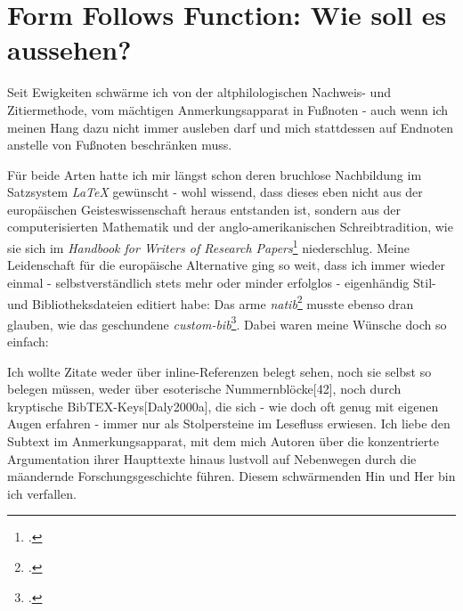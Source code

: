%
%
%
%
%
\section{Form Follows Function: Wie soll es aussehen?}

Seit Ewigkeiten schwärme ich von der altphilologischen Nachweis- und
Zitiermethode, vom mächtigen Anmerkungsapparat in Fußnoten - auch wenn ich
meinen Hang dazu nicht immer ausleben darf und mich stattdessen auf Endnoten
anstelle von Fußnoten beschränken muss.

Für beide Arten hatte ich mir längst schon deren bruchlose Nachbildung im
Satzsystem \emph{LaTeX} gewünscht - wohl wissend, dass dieses eben nicht aus der
europäischen Geisteswissenschaft heraus entstanden ist, sondern aus der
computerisierten Mathematik und der anglo-amerikanischen Schreibtradition, wie
sie sich im \textit{Handbook for Writers of Research
Papers}\footcite[vgl.][]{ModLanAss2009a} niederschlug. Meine Leidenschaft für
die europäische Alternative ging so weit, dass ich immer wieder einmal -
selbstverständlich stets mehr oder minder erfolglos - eigenhändig Stil- und
Bibliotheksdateien editiert habe: Das arme
\emph{natib}\footcite[vgl.][]{Daly2000a} musste ebenso dran glauben, wie das
geschundene \emph{custom-bib}\footcite[vgl.][]{Daly2007a}. Dabei waren meine
Wünsche doch so einfach:

Ich wollte Zitate weder über inline-Referenzen belegt sehen, noch sie selbst so
belegen müssen, weder über esoterische Nummernblöcke[42], noch durch kryptische
BibTEX-Keys[Daly2000a], die sich - wie doch oft genug mit eigenen Augen erfahren
- immer nur als Stolpersteine im Lesefluss erwiesen. Ich liebe den Subtext im
Anmerkungsapparat, mit dem mich Autoren über die konzentrierte Argumentation
ihrer Haupttexte hinaus lustvoll auf Nebenwegen durch die mäandernde
Forschungsgeschichte führen. Diesem schwärmenden Hin und Her bin ich verfallen.

